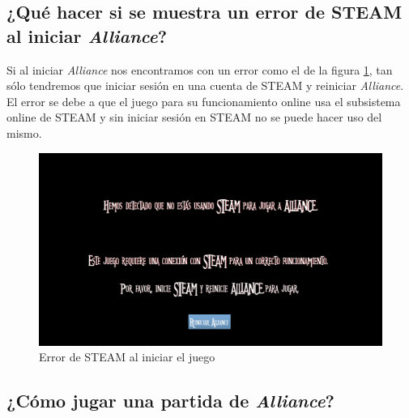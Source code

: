 \subsection{¿Qué hacer si se muestra un error de STEAM al iniciar \textit{Alliance}?}

Si al iniciar \textit{Alliance} nos encontramos con un error como el de la figura \ref{ErrorSteam}, tan sólo tendremos que iniciar sesión en una cuenta de STEAM y reiniciar \textit{Alliance}. El error se debe a que el juego para su funcionamiento online usa el subsistema online de STEAM y sin iniciar sesión en STEAM no se puede hacer uso del mismo.

\begin{figure}[h]
  \centering
  \includegraphics[width=12cm]{./images/ErrorSteam.png}
  \caption{Error de STEAM al iniciar el juego}
  \label{ErrorSteam}
\end{figure}


\subsection{¿Cómo jugar una partida de \textit{Alliance}?}

